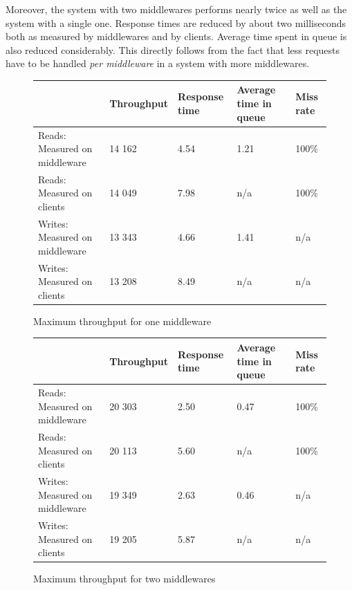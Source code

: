 \documentclass[11pt,a4paper]{article}
\begin{document}
Moreover, the system with two middlewares performs nearly twice as well as the system with a single one. Response times are reduced by about two milliseconds both as measured by middlewares and by clients. Average time spent in queue is also reduced considerably. This directly follows from the fact that less requests have to be handled \textit{per middleware} in a system with more middlewares.


\begin{figure}
    \centering
	\begin{tabular}{|l|p{2cm}|p{2cm}|p{2cm}|p{2cm}|}
		\hline                                & Throughput & Response time & Average time in queue & Miss rate \\
		\hline Reads: Measured on middleware  &     14 162 &          4.54 &                  1.21 &     100\% \\
		\hline Reads: Measured on clients     &     14 049 &          7.98 & n/a                   &     100\% \\
		\hline Writes: Measured on middleware &     13 343 &          4.66 &                  1.41 & n/a       \\
		\hline Writes: Measured on clients    &     13 208 &          8.49 & n/a                   & n/a       \\
		\hline
	\end{tabular}
    \caption{Maximum throughput for one middleware}
    \label{table::max_through_section_3_1mw}
\end{figure}

\begin{figure}
    \centering
	\begin{tabular}{|l|p{2cm}|p{2cm}|p{2cm}|p{2cm}|}
		\hline                                & Throughput & Response time & Average time in queue & Miss rate \\
		\hline Reads: Measured on middleware  &     20 303 &          2.50 &                  0.47 &     100\% \\
		\hline Reads: Measured on clients     &     20 113 &          5.60 & n/a                   &     100\% \\
		\hline Writes: Measured on middleware &     19 349 &          2.63 &                  0.46 & n/a       \\
		\hline Writes: Measured on clients    &     19 205 &          5.87 & n/a                   & n/a       \\
		\hline
	\end{tabular}
    \caption{Maximum throughput for two middlewares}
    \label{table::max_through_section_3_2mw}
\end{figure}
\end{document}
